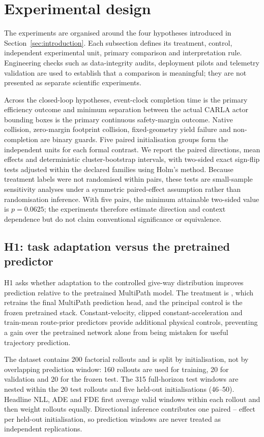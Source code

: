 \section{Experimental design}
\label{sec:experiments}

The experiments are organised around the four hypotheses introduced in
Section~\ref{sec:introduction}. Each subsection defines its treatment, control,
independent experimental unit, primary comparison and interpretation rule.
Engineering checks such as data-integrity audits, deployment pilots and
telemetry validation are used to establish that a comparison is meaningful;
they are not presented as separate scientific experiments.

Across the closed-loop hypotheses, event-clock completion time is the primary
efficiency outcome and minimum separation between the actual CARLA actor
bounding boxes is the primary continuous safety-margin outcome. Native
collision, zero-margin footprint collision, fixed-geometry yield failure and
non-completion are binary guards. Five paired initialisation groups form the
independent units for each formal contrast. We report the paired directions,
mean effects and deterministic cluster-bootstrap intervals, with two-sided
exact sign-flip tests adjusted within the declared families using Holm's
method. Because treatment labels were not randomised within pairs, these tests
are small-sample sensitivity analyses under a symmetric paired-effect
assumption rather than randomisation inference. With five pairs, the minimum
attainable two-sided value is $p=0.0625$; the experiments therefore estimate
direction and context dependence but do not claim conventional significance
or equivalence.

\subsection{H1: task adaptation versus the pretrained predictor}

H1 asks whether adaptation to the controlled give-way distribution improves
prediction relative to the pretrained MultiPath model. The treatment is
\Bone{}, which retrains the final MultiPath prediction head, and the principal
control is the frozen pretrained \Bzero{} stack. Constant-velocity, clipped
constant-acceleration and train-mean route-prior predictors provide additional
physical controls, preventing a gain over the pretrained network alone from
being mistaken for useful trajectory prediction.

The dataset contains 200 factorial rollouts and is split by initialisation,
not by overlapping prediction window: 160 rollouts are used for training, 20
for validation and 20 for the frozen test. The 315 full-horizon test windows
are nested within the 20 test rollouts and five held-out initialisations
(46--50). Headline NLL, ADE and FDE first average valid windows within each
rollout and then weight rollouts equally. Directional inference contributes
one paired \Bone{}--\Bzero{} effect per held-out initialisation, so prediction
windows are never treated as independent replications.

